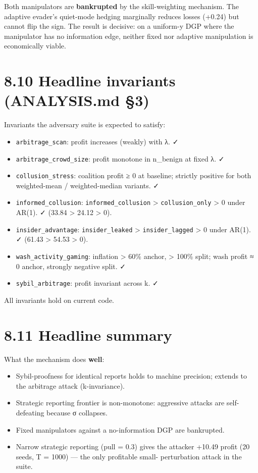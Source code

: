 \documentclass[11pt,a4paper,openany]{report}
\begin{document}
Both manipulators are \textbf{bankrupted} by the skill-weighting
mechanism. The adaptive evader's quiet-mode hedging marginally reduces
losses (+0.24) but cannot flip the sign. The result is decisive: on a
uniform-y DGP where the manipulator has no information edge, neither
fixed nor adaptive manipulation is economically viable.

\section{8.10 Headline invariants (ANALYSIS.md §3)}

Invariants the adversary suite is expected to satisfy:

\begin{itemize}
  \item \texttt{arbitrage\_scan}: profit increases (weakly) with λ. ✓
  \item \texttt{arbitrage\_crowd\_size}: profit monotone in n\_benign at fixed λ. ✓
  \item \texttt{collusion\_stress}: coalition profit ≥ 0 at baseline; strictly
    positive for both weighted-mean / weighted-median variants. ✓
  \item \texttt{informed\_collusion}: \texttt{informed\_collusion} > \texttt{collusion\_only} > 0
    under AR(1). ✓ (33.84 > 24.12 > 0).
  \item \texttt{insider\_advantage}: \texttt{insider\_leaked} > \texttt{insider\_lagged} > 0 under
    AR(1). ✓ (61.43 > 54.53 > 0).
  \item \texttt{wash\_activity\_gaming}: inflation > 60\% anchor, > 100\% split; wash
    profit ≈ 0 anchor, strongly negative split. ✓
  \item \texttt{sybil\_arbitrage}: profit invariant across k. ✓
\end{itemize}

All invariants hold on current code.

\section{8.11 Headline summary}

What the mechanism does \textbf{well}:

\begin{itemize}
  \item Sybil-proofness for identical reports holds to machine precision;
    extends to the arbitrage attack (k-invariance).
  \item Strategic reporting frontier is non-monotone: aggressive attacks
    are self-defeating because σ collapses.
  \item Fixed manipulators against a no-information DGP are bankrupted.
  \item Narrow strategic reporting (pull = 0.3) gives the attacker
    +10.49 profit (20 seeds, T = 1000) — the only profitable small-
    perturbation attack in the suite.
\end{itemize}
\end{document}
